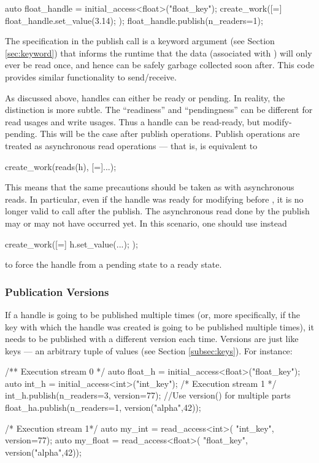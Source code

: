 \begin{CppCode}
auto float_handle = initial_access<float>("float_key");
create_work([=]{
  float_handle.set_value(3.14);
});
float_handle.publish(n_readers=1);
\end{CppCode}
The  specification in the publish call is a keyword
argument (see Section \ref{sec:keyword}) that informs the runtime that the data
(associated with ) will only ever be read once, and hence can be safely garbage collected soon after.  
This code provides similar functionality to send/receive.

As discussed above, handles can either be ready or pending. 
In reality, the distinction is more subtle. 
The ``readiness'' and ``pendingness'' can be different for read usages and write usages.
Thus a handle can be read-ready, but modify-pending.
This will be the case after publish operations.
Publish operations are treated as asynchronous read operations --- that is,
 is equivalent to
\begin{CppCode}
create_work(reads(h), [=]{...});  
\end{CppCode}
This means that the same precautions should be taken as with asynchronous reads. 
In particular, even if the handle was ready for modifying before
, it is no longer valid to call  after the publish.
The asynchronous read done by the publish may or may not have occurred yet.  
In this scenario, one should use instead
\begin{CppCode}
create_work([=]{ h.set_value(...); });
\end{CppCode}
to force the handle from a pending state to a ready state.

\subsubsection{Publication Versions}
If a handle is going to be published multiple times (or, more specifically, if
the key with which the handle was created is going to be published multiple
times), it needs to be published with a different version each time.  
Versions are just like keys --- an arbitrary tuple of values (see Section \ref{subsec:keys}).  
For instance:

\begin{minipage}{0.5\textwidth}
\begin{CppCode}
/** Execution stream 0 */
auto float_h =
  initial_access<float>("float_key");
auto int_h =
  initial_access<int>("int_key");
/* Execution stream 1 */
int_h.publish(n_readers=3, version=77);
//Use version() for multiple parts
float_ha.publish(n_readers=1, 
    version("alpha",42));
\end{CppCode}
\end{minipage}
\begin{minipage}{0.45\textwidth}
\begin{CppCode}
/* Execution stream 1*/
auto my_int =  read_access<int>(
  "int_key", version=77);
auto my_float = read_access<float>(
  "float_key", version("alpha",42));
\end{CppCode}
\end{minipage}

